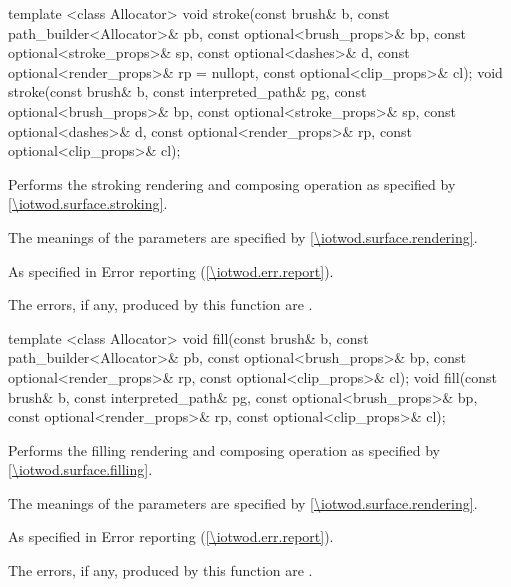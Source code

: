 %
\begin{itemdecl}
template <class Allocator>
void stroke(const brush& b, const path_builder<Allocator>& pb,
  const optional<brush_props>& bp,
  const optional<stroke_props>& sp,
  const optional<dashes>& d,
  const optional<render_props>& rp = nullopt,
  const optional<clip_props>& cl);
void stroke(const brush& b, const interpreted_path& pg,
  const optional<brush_props>& bp,
  const optional<stroke_props>& sp,
  const optional<dashes>& d,
  const optional<render_props>& rp,
  const optional<clip_props>& cl);
\end{itemdecl}
\begin{itemdescr}
\pnum
\effects
Performs the stroking rendering and composing operation as specified by \ref{\iotwod.surface.stroking}.

\pnum
The meanings of the parameters are specified by \ref{\iotwod.surface.rendering}.

\pnum
\throws
As specified in Error reporting (\ref{\iotwod.err.report}).

\pnum
\errors
The errors, if any, produced by this function are .
\end{itemdescr}

%
\begin{itemdecl}
template <class Allocator>
void fill(const brush& b, const path_builder<Allocator>& pb,
  const optional<brush_props>& bp,
  const optional<render_props>& rp,
  const optional<clip_props>& cl);
void fill(const brush& b, const interpreted_path& pg,
  const optional<brush_props>& bp,
  const optional<render_props>& rp,
  const optional<clip_props>& cl);
\end{itemdecl}
\begin{itemdescr}
\pnum
\effects
Performs the filling rendering and composing operation as specified by \ref{\iotwod.surface.filling}.

\pnum
The meanings of the parameters are specified by \ref{\iotwod.surface.rendering}.

\pnum
\throws
As specified in Error reporting (\ref{\iotwod.err.report}).

\pnum
\errors
The errors, if any, produced by this function are .
\end{itemdescr}


